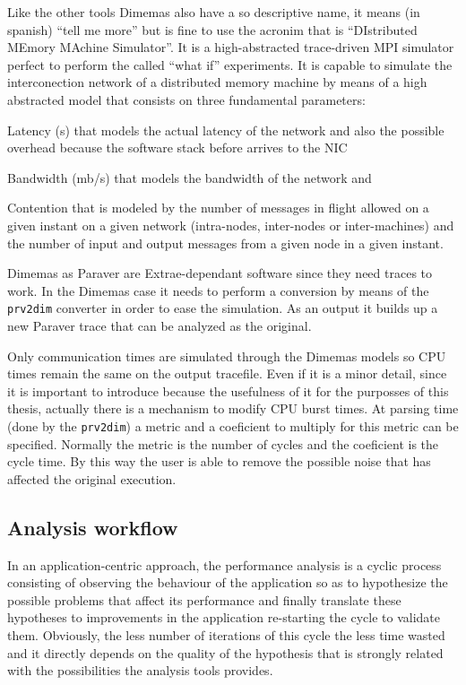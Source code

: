Like the other tools Dimemas also have a so descriptive name, it means (in
spanish) ``tell me more'' but is fine to use the acronim that is ``DIstributed
MEmory MAchine Simulator''. It is a high-abstracted trace-driven MPI simulator
perfect to perform the called ``what if'' experiments. It is capable to simulate
the interconection network of a distributed memory machine by means of a high
abstracted model that consists on three fundamental parameters:
\begin{enumerate*}[label=(\roman*)]
  \item Latency (s) that models the actual latency of the network and also the
    possible overhead because the software stack before arrives to the NIC
  \item Bandwidth (mb/s) that models the bandwidth of the network and
  \item Contention that is modeled by the number of messages in flight 
    allowed on a given instant on a given network (intra-nodes, inter-nodes or
    inter-machines) and the number of input and output messages from a given
    node in a given instant.
\end{enumerate*}

Dimemas as Paraver are Extrae-dependant software since they need traces to work.
In the Dimemas case it needs to perform a conversion by means of the {\tt
prv2dim} converter in order to ease the simulation. As an output it builds up a
new Paraver trace that can be analyzed as the original.

Only communication times are simulated through the Dimemas models so CPU times
remain the same on the output tracefile. Even if it is a minor detail, since it
is important to introduce because the usefulness of it for the purposses of this
thesis, actually there is a mechanism to modify CPU burst times. At parsing time
(done by the {\tt prv2dim}) a metric and a coeficient to multiply for this
metric can be specified. Normally the metric is the number of cycles and the
coeficient is the cycle time. By this way the user is able to remove the
possible noise that has affected the original execution.

\subsection{Analysis workflow}

In an application-centric
approach, the performance analysis is a cyclic process consisting of observing 
the behaviour of the application so as to hypothesize the possible problems that 
affect its performance and finally translate these hypotheses to improvements in
the application re-starting the cycle to validate them. Obviously, the less number 
of iterations of this cycle the less time wasted and it directly depends on the
quality of the hypothesis that is strongly related with the possibilities the
analysis tools provides.

